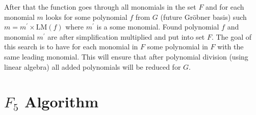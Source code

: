 After that the function goes through all monomials in the set $F$ and for each monomial $m$ looks for some polynomial $f$ from $G$ (future Gr\"obner basis) such $m = m^\prime \times \textrm{LM}(f)$ where $m^\prime$ is a some monomial. Found polynomial $f$ and monomial $m^\prime$ are after simplification multiplied and put into set $F$. The goal of this search is to have for each monomial in $F$ some polynomial in $F$ with the same leading monomial. This will ensure that after polynomial division (using linear algebra) all added polynomials will be reduced for $G$.

\section{$F_5$ Algorithm}
